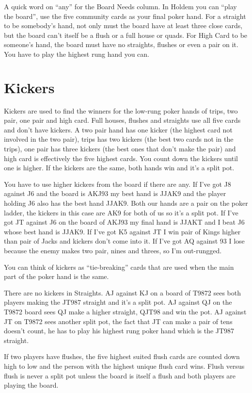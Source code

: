 A quick word on ``any'' for the Board Needs column. In
Holdem you can ``play the board'', use the five community cards as
your final poker hand. For a straight to be somebody's hand, not only
must the board have at least three close cards, but the board can't
itself be a flush or a full house or quads. For High Card to be
someone's hand, the board must have no straights, flushes or even a pair
on it. You have to play the highest rung hand you can.

\section{Kickers}

Kickers are used to find the winners for the low-rung poker hands of
trips, two pair, one pair and high card. Full houses, flushes and
straights use all five cards and don't have kickers. A two pair hand
has one kicker (the highest card not involved in the two pair), trips
has two kickers (the best two cards not in the trips), one pair has
three kickers (the best ones that don't make the pair) and high card
is effectively the five highest cards. You count down the kickers
until one is higher. If the kickers are the same, both hands win and
it's a split pot.

You have to use higher kickers from the board if there are any.
If I've got J8 against J6 and the board is AKJ93 my best hand is JJAK9
and the player holding J6 also has the best hand JJAK9. Both our hands
are a pair on the poker ladder, the kickers in this case are AK9 for
both of us so it's a split pot. If I've got JT against J6 on the board
of AKJ93 my final hand is JJAKT and I beat J6 whose best hand is
JJAK9. If I've got K5 against JT I win pair of Kings higher than pair
of Jacks and kickers don't come into it. If I've got AQ against 93 I
lose because the enemy makes two pair, nines and threes, so I'm
out-rungged.

You can think of kickers as ``tie-breaking'' cards that are used when
the main part of the poker hand is the same.

There are no kickers in Straights. AJ against KJ on a board of
T9872 sees both players making the JT987 straight and it's a split
pot. AJ against QJ on the T9872 board sees QJ make a higher
straight, QJT98 and win the pot. AJ against JT on T9872 sees another
split pot, the fact that JT can make a pair of tens doesn't count, he
has to play his highest rung poker hand which is the JT987 straight.

If two players have flushes, the five highest suited flush cards are
counted down high to low and the person with the highest unique flush
card wins. Flush versus flush is never a split pot unless the board is
itself a flush and both players are playing the board.

